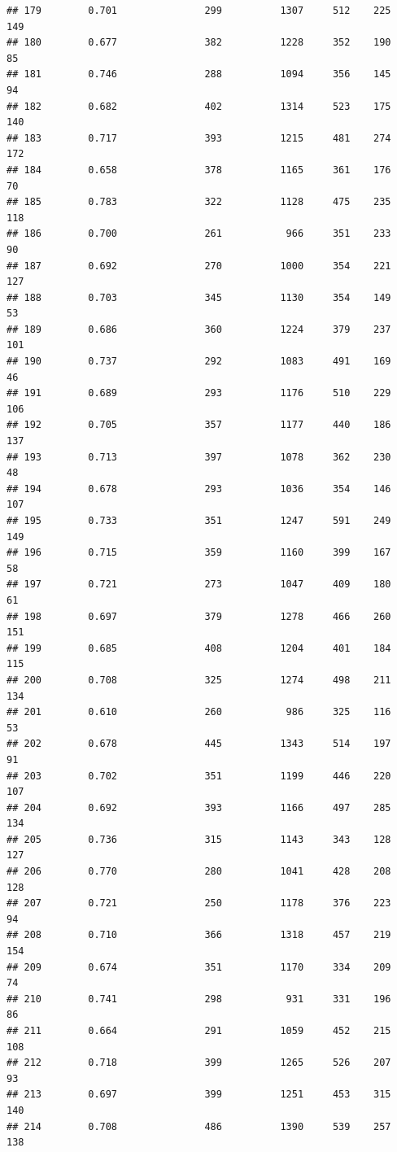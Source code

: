 \documentclass[]{book}
\begin{document}
\begin{verbatim}
## 179        0.701               299          1307     512    225    149
## 180        0.677               382          1228     352    190     85
## 181        0.746               288          1094     356    145     94
## 182        0.682               402          1314     523    175    140
## 183        0.717               393          1215     481    274    172
## 184        0.658               378          1165     361    176     70
## 185        0.783               322          1128     475    235    118
## 186        0.700               261           966     351    233     90
## 187        0.692               270          1000     354    221    127
## 188        0.703               345          1130     354    149     53
## 189        0.686               360          1224     379    237    101
## 190        0.737               292          1083     491    169     46
## 191        0.689               293          1176     510    229    106
## 192        0.705               357          1177     440    186    137
## 193        0.713               397          1078     362    230     48
## 194        0.678               293          1036     354    146    107
## 195        0.733               351          1247     591    249    149
## 196        0.715               359          1160     399    167     58
## 197        0.721               273          1047     409    180     61
## 198        0.697               379          1278     466    260    151
## 199        0.685               408          1204     401    184    115
## 200        0.708               325          1274     498    211    134
## 201        0.610               260           986     325    116     53
## 202        0.678               445          1343     514    197     91
## 203        0.702               351          1199     446    220    107
## 204        0.692               393          1166     497    285    134
## 205        0.736               315          1143     343    128    127
## 206        0.770               280          1041     428    208    128
## 207        0.721               250          1178     376    223     94
## 208        0.710               366          1318     457    219    154
## 209        0.674               351          1170     334    209     74
## 210        0.741               298           931     331    196     86
## 211        0.664               291          1059     452    215    108
## 212        0.718               399          1265     526    207     93
## 213        0.697               399          1251     453    315    140
## 214        0.708               486          1390     539    257    138

\end{verbatim}
\end{document}
